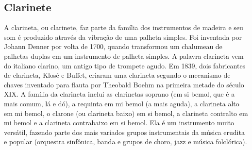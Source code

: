 \subsection*{Clarinete}

A clarineta, ou clarinete, faz parte da família dos instrumentos de
madeira e seu som é produzido através da vibração de uma palheta
simples. Foi inventada por Johann Denner por volta de 1700, quando
transformou um chalumeau de palhetas duplas em um instrumento de
palheta simples. A palavra clarineta vem do italiano clarino, um
antigo tipo de trompete agudo. Em 1839, dois fabricantes de clarineta,
Klosé e Buffet, criaram uma clarineta segundo o mecanismo de chaves
inventado para flauta por Theobald Boehm na primeira metade do século
XIX. A família da clarineta inclui as clarinetas soprano (em si bemol,
que é a mais comum, lá e dó), a requinta em mi bemol (a mais aguda), a
clarineta alto em mi bemol, o clarone (ou clarineta baixo) em si
bemol, a clarineta contralto em mi bemol e a clarineta contrabaixo em
si bemol. Ela é um instrumento muito versátil, fazendo parte dos mais
variados grupos instrumentais da música erudita e popular (orquestra
sinfônica, banda e grupos de choro, jazz e música folclórica).